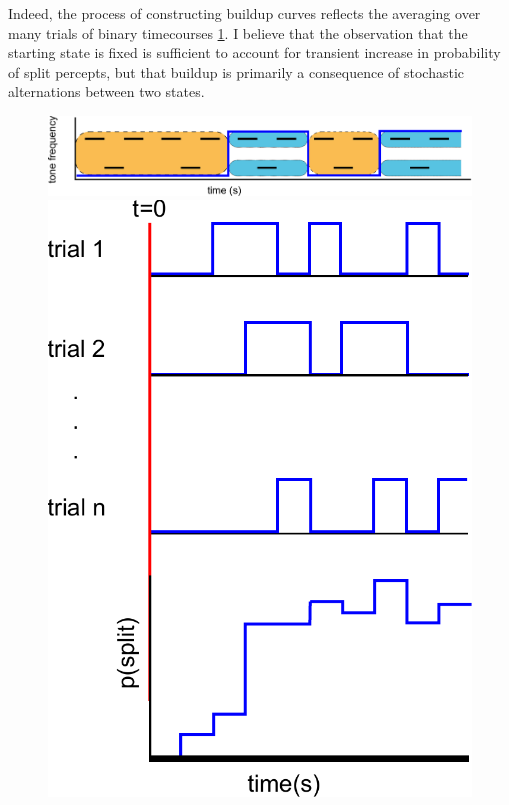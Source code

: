 \documentclass[10pt]{article}
\begin{document}
Indeed, the process of constructing buildup curves reflects the averaging over many trials of binary timecourses \ref{fig:TrialAvg}. I believe that the observation that the starting state is fixed is sufficient to account for transient increase in probability of split percepts, but that buildup is primarily a consequence of stochastic alternations between two states.

\begin{figure}
	\centering
	\includegraphics[scale=0.35]{../percepts_timecourse_binary}
	\includegraphics[scale=0.5]{../TrialAvg}
	\caption{}
	\label{fig:TrialAvg}
\end{figure}
\end{document}
